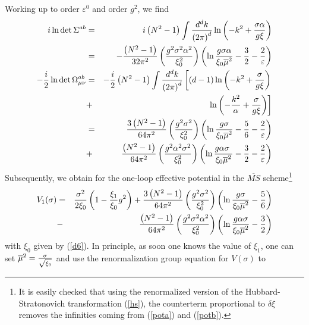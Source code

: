\documentclass[a4paper,12pt]{article}
\begin{document}
Working up to order $\varepsilon ^{0}$ and order $g^{2}$, we find
\begin{eqnarray}
\label{pota}i\ln \det \Sigma ^{ab} &=&i\left( N^{2}-1\right) \int
\frac{d^{d}k}{\left( 2\pi \right) ^{d}}\ln \left(
-k^{2}+\frac{\sigma \alpha }{g\xi }\right)
\nonumber   \\
&=&-\frac{\left( N^{2}-1\right) }{32\pi ^{2}}\left( \frac{g^{2}\sigma
^{2}\alpha ^{2}}{\xi _{0}^{2}}\right) \left( \ln \frac{g\sigma \alpha }{\xi
_{0}\overline{\mu }^{2}}-\frac{3}{2}-\frac{2}{\varepsilon }\right)  \\
\label{potb}-\frac{i}{2}\ln \det \Omega _{\mu \nu }^{ab}
&=&-\frac{i}{2}\left( N^{2}-1\right) \int \frac{d^{d}k}{\left(
2\pi \right) ^{d}}\left[ (d-1)\ln
\left( -k^{2}+\frac{\sigma }{g\xi }\right) \right.   \nonumber \\
&+&\left. \ln \left( -\frac{k^{2}}{\alpha }+\frac{\sigma }{g\xi }\right)
\right]   \nonumber \\
&=&\frac{3\left( N^{2}-1\right) }{64\pi ^{2}}\left( \frac{g^{2}\sigma ^{2}}{%
\xi _{0}^{2}}\right) \left( \ln \frac{g\sigma }{\xi _{0}\overline{\mu }^{2}}-%
\frac{5}{6}-\frac{2}{\varepsilon }\right)   \nonumber \\
&+&\frac{\left( N^{2}-1\right) }{64\pi ^{2}}\left( \frac{g^{2}\alpha
^{2}\sigma ^{2}}{\xi _{0}^{2}}\right) \left( \ln \frac{g\alpha \sigma \ }{%
\xi _{0}\overline{\mu }^{2}}-\frac{3}{2}-\frac{2}{\varepsilon }\right)
\end{eqnarray}
Subsequently, we obtain for the one-loop effective potential in the $%
\overline{MS}$ scheme\footnote{%
It is easily checked that using the renormalized version of the
Hubbard-Stratonovich transformation (\ref{hs}), the counterterm
proportional to $\delta\xi$ removes the infinities coming from
(\ref{pota}) and (\ref{potb}).}
\begin{eqnarray}
V_{1}(\sigma ) &=&\frac{\sigma ^{2}}{2\xi _{0}}\left( 1-\frac{\xi _{1}}{\xi
_{0}}g^{2}\right) +\frac{3\left( N^{2}-1\right) }{64\pi ^{2}}\left( \frac{%
g^{2}\sigma ^{2}}{\xi _{0}^{2}}\right) \left( \ln \frac{g\sigma }{\xi _{0}%
\overline{\mu }^{2}}-\frac{5}{6}\right)   \nonumber  \label{f1} \\
&-&\frac{\left( N^{2}-1\right) }{64\pi ^{2}}\left( \frac{g^{2}\sigma
^{2}\alpha ^{2}}{\xi _{0}^{2}}\right) \left( \ln \frac{g\alpha \sigma }{\xi
_{0}\overline{\mu }^{2}}-\frac{3}{2}\right)
\end{eqnarray}
with $\xi _{0}$ given by (\ref{d6}). In principle, as soon one knows the
value of $\xi _{1}$, one can set $\overline{\mu }^{2}=\frac{\sigma }{\sqrt{%
\xi _{0}}}$ and use the renormalization group equation for $V(\sigma )$ to
\end{document}
